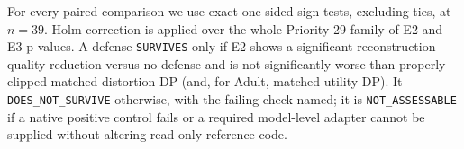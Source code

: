 For every paired comparison we use exact one-sided sign tests, excluding ties,
at $n=39$.  Holm correction is applied over the whole Priority 29 family of E2
and E3 p-values.   A defense \texttt{SURVIVES} only if E2 shows a
significant reconstruction-quality reduction versus no defense and is not
significantly worse than properly clipped matched-distortion DP (and, for
Adult, matched-utility DP).  It \texttt{DOES\_NOT\_SURVIVE} otherwise, with
the failing check named; it is \texttt{NOT\_ASSESSABLE} if a native positive
control fails or a required model-level adapter cannot be supplied without
altering read-only reference code.  
